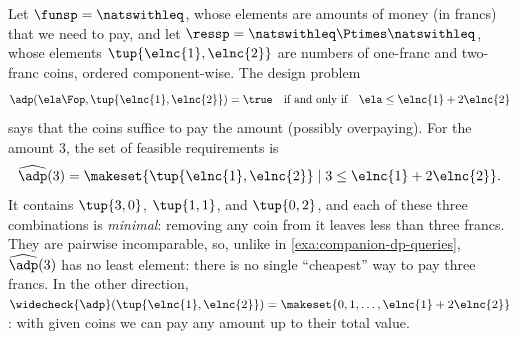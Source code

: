 \begin{example}
    \label{exa:coins-dp}
    Let $\funsp = \natswithleq$, whose elements are amounts of money (in francs) that we need to pay, and let $\ressp = \natswithleq \Ptimes \natswithleq$, whose elements $\tup{\elnc{1}, \elnc{2}}$ are numbers of one-franc and two-franc coins, ordered component-wise.
    The design problem
    \begin{equation}
        \adp(\ela\Fop, \tup{\elnc{1}, \elnc{2}}) = \true
        \quad \text{if and only if} \quad
        \ela \leq \elnc{1} + 2\elnc{2}
    \end{equation}
    says that the coins suffice to pay the amount (possibly overpaying).
    For the amount $3$, the set of feasible requirements is
    \begin{equation}
        \widehat{\adp}(3) = \makeset{\tup{\elnc{1}, \elnc{2}} \mid 3 \leq \elnc{1} + 2\elnc{2}}.
    \end{equation}
    It contains $\tup{3, 0}$, $\tup{1, 1}$, and $\tup{0, 2}$, and each of these three combinations is \emph{minimal}: removing any coin from it leaves less than three francs.
    They are pairwise incomparable, so, unlike in \cref{exa:companion-dp-queries}, $\widehat{\adp}(3)$ has no least element: there is no single ``cheapest'' way to pay three francs.
    In the other direction, $\widecheck{\adp}(\tup{\elnc{1}, \elnc{2}}) = \makeset{0, 1, \dots, \elnc{1} + 2\elnc{2}}$: with given coins we can pay any amount up to their total value.
\end{example}

